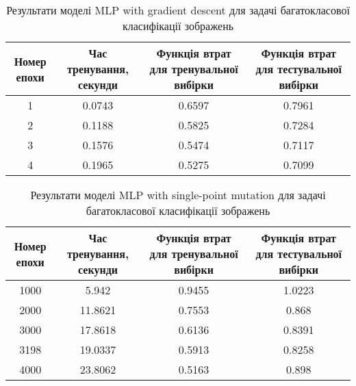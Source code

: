 \begin{table}[ht]
	\centering
	\begin{adjustbox}{max width=\textwidth}
		\begin{tabular}{|c|c|c|c|}
			\hline 
			Номер епохи & Час тренування, секунди & Функція втрат для тренувальної вибірки & Функція втрат для тестувальної вибірки \\
			\hline 
			1 & 0.0743 & 0.6597 & 0.7961 \\
			\hline 
			2 & 0.1188 & 0.5825 & 0.7284 \\
			\hline
			3 & 0.1576 & 0.5474 & 0.7117 \\
			\hline
			4 & 0.1965 & 0.5275 & 0.7099 \\
			\hline
		\end{tabular}
	\end{adjustbox}
	\caption{Результати моделі MLP with gradient descent для задачі багатокласової класифікації зображень}
	\label{mlp_gd_mc_id_results}
\end{table}

\begin{table}[ht]
	\centering
	\begin{adjustbox}{max width=\textwidth}
		\begin{tabular}{|c|c|c|c|}
			\hline 
			Номер епохи & Час тренування, секунди & Функція втрат для тренувальної вибірки & Функція втрат для тестувальної вибірки \\
			\hline 
			1000 & 5.942 & 0.9455 & 1.0223 \\
			\hline 
			2000 & 11.8621 & 0.7553 & 0.868 \\
			\hline
			3000 & 17.8618 & 0.6136 & 0.8391 \\
			\hline
			3198 & 19.0337 & 0.5913 & 0.8258 \\
			\hline
			4000 & 23.8062 & 0.5163 & 0.898 \\
			\hline
		\end{tabular}
	\end{adjustbox}
	\caption{Результати моделі MLP with single-point mutation для задачі багатокласової класифікації зображень}
	\label{mlp_spm_mc_id_results}
\end{table}

